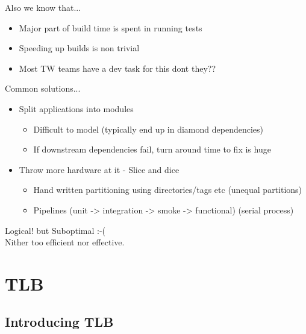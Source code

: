 \documentclass{beamer}
\begin{document}
\begin{frame}{Also we know that...}
  \begin{centering}
    \begin{itemize}
    \item Major part of build time is spent in running tests
      \pause
    \item Speeding up builds is non trivial
      \pause
    \item Most TW teams have a dev task for this dont they??
    \end{itemize}
  \end{centering}
\end{frame}

\begin{frame}{Common solutions...}
  \begin{centering}
    \begin{itemize}
    \item Split applications into modules
      \pause
      \begin{itemize}
      \item Difficult to model (typically end up in diamond dependencies)
        \pause
      \item If downstream dependencies fail, turn around time to fix is huge
      \end{itemize}      
      \pause
    \item Throw more hardware at it - Slice and dice
      \pause
      \begin{itemize}
      \item Hand written partitioning using directories/tags etc (unequal partitions)
        \pause
      \item Pipelines (unit -> integration -> smoke -> functional) (serial process)
      \end{itemize}
    \end{itemize}
    \pause
  \end{centering}
  \pause
  Logical! but Suboptimal :-(\\
  \pause
  Nither too efficient nor effective.
\end{frame}

\section{TLB}

\subsection{Introducing TLB}
\end{document}
